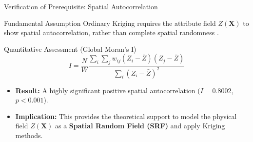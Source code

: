 \documentclass[10pt, aspectratio=169]{beamer}
\begin{document}
\begin{frame}{Verification of Prerequisite: Spatial Autocorrelation}
    \begin{block}{Fundamental Assumption}
        Ordinary Kriging requires the attribute field $Z(\mathbf{X})$ to show spatial autocorrelation, rather than complete spatial randomness \cite{cressie2015statistics}.
    \end{block}

    \vspace{0.3cm}
    \begin{block}{Quantitative Assessment (Global Moran's I)}
        \begin{equation}
            I = \frac{N}{W} \frac{\sum_{i} \sum_{j} w_{ij}(Z_i - \bar{Z})(Z_j - \bar{Z})}{\sum_{i} (Z_i - \bar{Z})^2}
        \end{equation}
    \end{block}

    \begin{itemize}
        \item \textbf{Result:} A highly significant positive spatial autocorrelation ($I = 0.8002$, $p < 0.001$).
        \item \textbf{Implication:} This provides the theoretical support to model the physical field $Z(\mathbf{X})$ as a \textbf{Spatial Random Field (SRF)} and apply Kriging methods.
    \end{itemize}

\end{frame}
\end{document}
